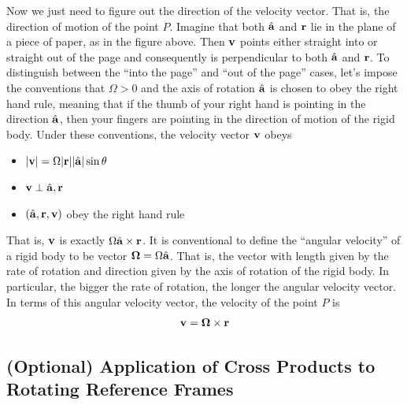 Now we just need to figure out the direction
of the velocity vector. That is, the direction of motion of the point $P$.
Imagine that both $\hat{\mathbf{a}}$ and $\mathbf{r}$ lie in the plane of a piece of paper, 
as in the figure above. Then $\mathbf{v}$ points either straight into 
or straight out of the page and consequently is perpendicular
to both $\hat{\mathbf{a}}$ and $\mathbf{r}$. To distinguish between the ``into the page''
and ``out of the page'' cases, let's impose the conventions that 
$\Omega>0$ and the axis of rotation $\hat{\mathbf{a}}$ is chosen to obey the right hand
 rule, meaning that if the thumb of
your right hand is pointing in the direction $\hat{\mathbf{a}}$, then your fingers
are pointing in the direction of motion of the rigid body.  Under these
conventions, the velocity vector $\mathbf{v}$ obeys
\begin{itemize}
\item $|\mathbf{v}|=\Omega|\mathbf{r}||\hat{\mathbf{a}}|\sin\theta$
\item $\mathbf{v}\perp\hat{\mathbf{a}},\mathbf{r}$
\item $(\hat{\mathbf{a}},\mathbf{r},\mathbf{v})$ obey the right hand rule
\end{itemize}
That is, $\mathbf{v}$ is exactly $\Omega\hat{\mathbf{a}}\times\mathbf{r}$. It is conventional
to define the ``angular velocity'' of a rigid body to be vector
$\mathbf{\Omega}=\Omega\hat{\mathbf{a}}$. That is, the vector with length given 
by the rate of rotation and direction given by the axis of rotation 
of the rigid body. In particular, the bigger the rate of rotation, the longer
the angular velocity vector. In terms of this angular 
velocity vector, the velocity of the point $P$ is
\begin{align*}
\mathbf{v}=\mathbf{\Omega}\times\mathbf{r}
\end{align*}

\subsection{(Optional) Application of Cross Products to Rotating Reference Frames}\label{sec rot frame}

